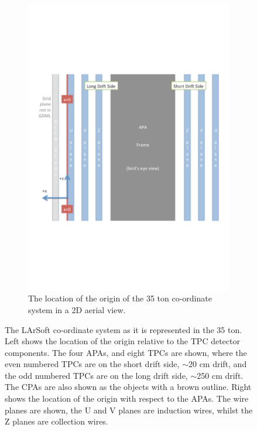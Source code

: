 \begin{figure}[h]
\begin{subfigure}{0.45\textwidth}
    \includegraphics[width=\textwidth]{35ton_xCenter}
    \caption{The location of the origin of the 35 ton co-ordinate system in a 2D aerial view.}
  \end{subfigure}
  \caption[The LArSoft co-ordinate system as it is represented in the 35 ton.]
          {The LArSoft co-ordinate system as it is represented in the 35 ton. Left shows the location of the origin relative to the TPC detector components. The four APAs, and eight TPCs are shown, where the even numbered TPCs are on the short drift side, $\sim$20 cm drift, and the odd numbered TPCs are on the long drift side, $\sim$250 cm drift. The CPAs are also shown as the objects with a brown outline. Right shows the location of the origin with respect to the APAs. The wire planes are shown, the U and V planes are induction wires, whilst the Z planes are collection wires.}
  \label{fig:LArSoft_coords}
\end{figure}

